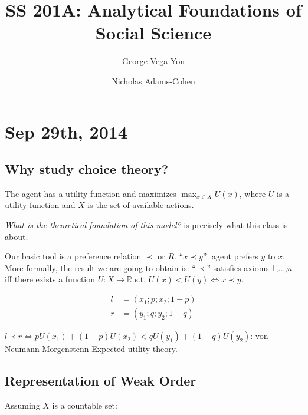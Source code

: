 \documentclass{article}
\title{SS 201A: Analytical Foundations of Social Science}
\author{George Vega Yon\and Nicholas Adams-Cohen}
\def\reals{\mathbb{R}}
\begin{document}
\maketitle

\section*{Sep 29th, 2014}

\subsection*{Why study choice theory?}

The agent has a utility function and maximizes $\max_{x\in X}U(x)$, where $U$ is
a utility function and $X$ is the set of available actions.

\emph{What is the theoretical foundation of this model?} is precisely what this
class is about.

Our basic tool is a preference relation $\prec$ or $R$. ``$x\prec y$'': agent 
prefers $y$ to $x$. More formally, the result we are going to obtain is: 
``$\prec$'' satisfies  axioms 1,...,$n$ iff there exists a function 
$U:X\to\reals$ s.t. $U(x)<U(y) \iff x\prec y$.

\begin{align*}
l&=(x_1;p;x_2;1-p) \\
r&=(y_1;q;y_2;1-q)
\end{align*}

$l\prec r \iff pU(x_1) + (1-p)U(x_2) < qU(y_1) + (1-q)U(y_2)$: von 
Neumann-Morgenstenn Expected utility theory.

\subsection*{Representation of Weak Order}

Assuming $X$ is a countable set:
\end{document}
